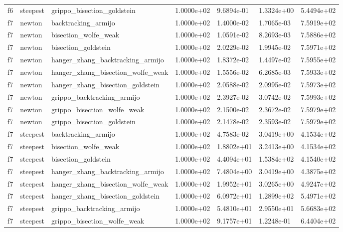 \documentclass[a4paper,11pt]{article}
\numberwithin{equation}{section} %
\begin{document}
\begin{longtable}{p{1.5cm}|p{1.5cm}|p{4cm}|p{2cm}|p{2cm}|p{2cm}|p{2cm}}
        f6 & steepest & grippo\_bisection\_goldstein & 1.0000e+02 & 9.6894e-01 & 1.3324e+00 & 5.4494e+02 \\
        f7 & newton & backtracking\_armijo & 1.0000e+02 & 1.4000e-02 & 1.7065e-03 & 7.5919e+02 \\
        f7 & newton & bisection\_wolfe\_weak & 1.0000e+02 & 1.0591e-02 & 8.2693e-03 & 7.5886e+02 \\
        f7 & newton & bisection\_goldstein & 1.0000e+02 & 2.0229e-02 & 1.9945e-02 & 7.5971e+02 \\
        f7 & newton & hanger\_zhang\_backtracking\_armijo & 1.0000e+02 & 1.8372e-02 & 1.4497e-02 & 7.5955e+02 \\
        f7 & newton & hanger\_zhang\_bisection\_wolfe\_weak & 1.0000e+02 & 1.5556e-02 & 6.2685e-03 & 7.5933e+02 \\
        f7 & newton & hanger\_zhang\_bisection\_goldstein & 1.0000e+02 & 2.0588e-02 & 2.0995e-02 & 7.5973e+02 \\
        f7 & newton & grippo\_backtracking\_armijo & 1.0000e+02 & 2.3927e-02 & 3.0742e-02 & 7.5993e+02 \\
        f7 & newton & grippo\_bisection\_wolfe\_weak & 1.0000e+02 & 2.1500e-02 & 2.3672e-02 & 7.5979e+02 \\
        f7 & newton & grippo\_bisection\_goldstein & 1.0000e+02 & 2.1478e-02 & 2.3593e-02 & 7.5979e+02 \\
        f7 & steepest & backtracking\_armijo & 1.0000e+02 & 4.7583e-02 & 3.0419e+00 & 4.1534e+02 \\
        f7 & steepest & bisection\_wolfe\_weak & 1.0000e+02 & 1.8802e+01 & 3.2413e+00 & 4.1534e+02 \\
        f7 & steepest & bisection\_goldstein & 1.0000e+02 & 4.4094e+01 & 1.5384e+02 & 4.1540e+02 \\
        f7 & steepest & hanger\_zhang\_backtracking\_armijo & 1.0000e+02 & 7.4804e+00 & 3.0419e+00 & 4.3875e+02 \\
        f7 & steepest & hanger\_zhang\_bisection\_wolfe\_weak & 1.0000e+02 & 1.9952e+01 & 3.0265e+00 & 4.9247e+02 \\
        f7 & steepest & hanger\_zhang\_bisection\_goldstein & 1.0000e+02 & 6.0972e+01 & 1.2899e+02 & 5.4971e+02 \\
        f7 & steepest & grippo\_backtracking\_armijo & 1.0000e+02 & 5.4810e+01 & 2.9550e+01 & 5.6683e+02 \\
        f7 & steepest & grippo\_bisection\_wolfe\_weak & 1.0000e+02 & 9.1757e+01 & 1.2248e-01 & 6.4404e+02 \\

\end{longtable}
\end{document}
